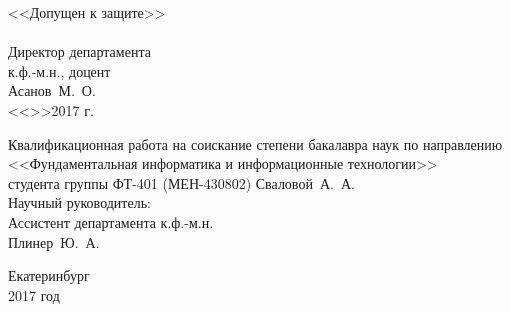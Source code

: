 \documentclass[12pt]{article}
\begin{document}
{		\hspace{-1cm}
		\begin{minipage}{80mm}
			\noindent
			\vspace{-2.3cm}
			\begin{flushleft}
				\begin{spacing}{1.0}
				\large <<Допущен к защите>>\\
				\underline{\hspace{6cm}}\\
				\large Директор департамента\\
				\large к.ф.-м.н., доцент\\
				\large Асанов~М.~О.
				\underline{\hspace{6cm}}\\
				<<\underline{\hspace{0.7cm}}>>\underline{\hspace{3cm}}2017 г.
				\end{spacing}
			\end{flushleft}
		\end{minipage}
		\begin{minipage}{90mm}
			\begin{flushleft}
				\begin{spacing}{1.0}
				\large Квалификационная работа на соискание степени бакалавра наук по направлению\\
				\large <<Фундаментальная информатика и информационные технологии>>\\
				\large студента группы ФТ-401 (МЕН-430802) Сваловой~А.~А.\\
				\large Научный руководитель:\\
				\large Ассистент департамента к.ф.-м.н.\\
				\large Плинер~Ю.~А.
				\end{spacing}
			\end{flushleft}
		\end{minipage}
		
		\vfill
		
		\begin{center}
			Екатеринбург\\
			2017 год
		\end{center}
	}

	\newpage
	
	{\pagestyle{plain}
		\tableofcontents
	}

	\newpage
	
\end{document}
